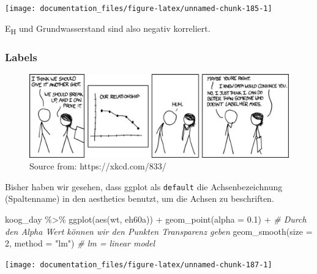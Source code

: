 \documentclass[
]{article}
\newenvironment{Shaded}{\begin{snugshade}}{\end{snugshade}}
\newcommand{\AttributeTok}[1]{\textcolor[rgb]{0.77,0.63,0.00}{#1}}
\newcommand{\CommentTok}[1]{\textcolor[rgb]{0.56,0.35,0.01}{\textit{#1}}}
\newcommand{\DecValTok}[1]{\textcolor[rgb]{0.00,0.00,0.81}{#1}}
\newcommand{\FloatTok}[1]{\textcolor[rgb]{0.00,0.00,0.81}{#1}}
\newcommand{\FunctionTok}[1]{\textcolor[rgb]{0.00,0.00,0.00}{#1}}
\newcommand{\NormalTok}[1]{#1}
\newcommand{\SpecialCharTok}[1]{\textcolor[rgb]{0.00,0.00,0.00}{#1}}
\newcommand{\StringTok}[1]{\textcolor[rgb]{0.31,0.60,0.02}{#1}}
\begin{document}
\begin{center}\texttt{[image: documentation\_files/figure-latex/unnamed-chunk-185-1]} \end{center}

E\textsubscript{H} und Grundwasserstand sind also negativ korreliert.

\hypertarget{labels}{%
\subsubsection{Labels}\label{labels}}

\begin{figure}

{\centering \includegraphics[width=1\linewidth]{images/052} 

}

\caption{Source from: https://xkcd.com/833/}\label{fig:unnamed-chunk-186}
\end{figure}

Bisher haben wir gesehen, dass ggplot als \texttt{default} die Achsenbezeichnung (Spaltenname) in den aesthetics benutzt, um die Achsen zu beschriften.

\begin{Shaded}
\begin{Highlighting}[]
\NormalTok{koog\_day  }\SpecialCharTok{\%\textgreater{}\%}
  \FunctionTok{ggplot}\NormalTok{(}\FunctionTok{aes}\NormalTok{(wt, eh60a)) }\SpecialCharTok{+}
  \FunctionTok{geom\_point}\NormalTok{(}\AttributeTok{alpha =} \FloatTok{0.1}\NormalTok{) }\SpecialCharTok{+} \CommentTok{\# Durch den Alpha Wert können wir den Punkten Transparenz geben}
  \FunctionTok{geom\_smooth}\NormalTok{(}\AttributeTok{size =} \DecValTok{2}\NormalTok{, }\AttributeTok{method =} \StringTok{"lm"}\NormalTok{) }\CommentTok{\# lm = linear model}
\end{Highlighting}
\end{Shaded}

\begin{center}\texttt{[image: documentation\_files/figure-latex/unnamed-chunk-187-1]} \end{center}
\end{document}
